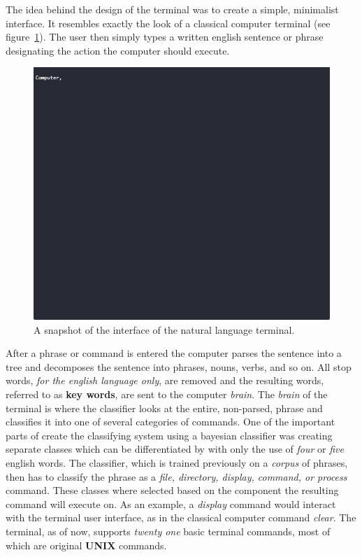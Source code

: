 \documentclass[12pt]{article}
\begin{document}
The idea behind the design of the terminal was to create a simple, minimalist interface. It resembles exactly the look of a classical computer terminal (see figure~\ref{figure_one}). The user then simply types a written english sentence or phrase designating the action the computer should execute.

\begin{figure}
  \centering
    \includegraphics[width=\textwidth]{terminal}
  \caption{A snapshot of the interface of the natural language terminal.}
  \label{figure_one}
\end{figure}

After a phrase or command is entered the computer parses the sentence into a tree and decomposes the sentence into phrases, nouns, verbs, and so on. All stop words, {\it for the english language only}, are removed and the resulting words, referred to as \textbf{key words}, are sent to the computer {\it brain}. The {\it brain} of the terminal is where the classifier looks at the entire, non-parsed, phrase and classifies it into one of several categories of commands. One of the important parts of create the classifying system using a bayesian classifier was creating separate classes which can be differentiated by with only the use of {\it four} or {\it five} english words. The classifier, which is trained previously on a {\it corpus} of phrases, then has to classify the phrase as a {\it file, directory, display, command, or process} command. These classes where selected based on the component the resulting command will execute on. As an example, a {\it display} command would interact with the terminal user interface, as in the classical computer command {\it clear}. The terminal, as of now, supports {\it twenty one} basic terminal commands, most of which are original \textbf{UNIX} commands.
\end{document}
